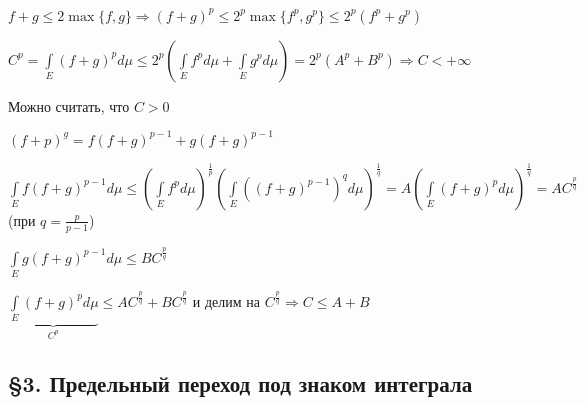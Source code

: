 \documentclass[12pt]{article}
\begin{document}
$f + g \leq 2\max\{f, g\} \Rightarrow (f + g)^p \leq 2^p\max\{f^p, g^p\} \leq 2^p(f^p + g^p)$

$C^p = \int\limits_E (f + g)^pd\mu \leq 2^p (\int\limits_E f^pd\mu + \int\limits_E g^pd\mu) = 2^p(A^p + B^p) \Rightarrow C < + \infty$

Можно считать, что $C > 0$

$(f + p)^g = f(f + g)^{p - 1} + g(f + g)^{p - 1}$

$\int\limits_E f(f + g)^{p - 1}d\mu \leq (\int\limits_E f^pd\mu)^\frac{1}{p}(\int\limits_E ((f + g)^{p -1})^qd\mu)^\frac{1}{q} = A(\int\limits_E (f + g)^pd\mu)^\frac{1}{q} = A C^\frac{p}{q}$ (при $q = \frac{p}{p - 1}$)

$\int\limits_E g(f + g)^{p - 1}d\mu \leq B C^\frac{p}{q}$

$\underbrace{\int\limits_E (f + g)^pd\mu}_{C^p} \leq AC^\frac{p}{q} + BC^\frac{p}{q}$ и делим на $C^\frac{p}{q} \Rightarrow C \leq A + B$

\newpage

\subsection{\S 3. Предельный переход под знаком интеграла}
\end{document}
